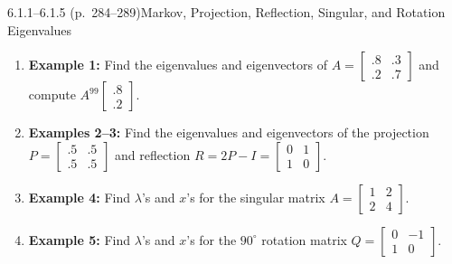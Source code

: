 \documentclass[11pt,a4paper,openany,oneside]{book}
\def\vect#1{#1}%
\def\mathbf#1{#1}%
\newcommand{\vect}[1]{\mathbf{#1}}
\numberwithin{equation}{chapter}
\begin{document}
\begin{example}{6.1.1--6.1.5 (p.\ 284--289)}{Markov, Projection, Reflection, Singular, and Rotation Eigenvalues}
\begin{enumerate}
\item \textbf{Example 1:} Find the eigenvalues and eigenvectors of $A = \begin{bmatrix}.8 & .3\\.2 & .7\end{bmatrix}$ and compute $A^{99}\begin{bmatrix}.8\\.2\end{bmatrix}$.
\item \textbf{Examples 2--3:} Find the eigenvalues and eigenvectors of the projection $P = \begin{bmatrix}.5 & .5\\.5 & .5\end{bmatrix}$ and reflection $R = 2P - I = \begin{bmatrix}0 & 1\\1 & 0\end{bmatrix}$.
\item \textbf{Example 4:} Find $\lambda$'s and $\vect{x}$'s for the singular matrix $A = \begin{bmatrix}1 & 2\\2 & 4\end{bmatrix}$.
\item \textbf{Example 5:} Find $\lambda$'s and $\vect{x}$'s for the $90^\circ$ rotation matrix $Q = \begin{bmatrix}0 & -1\\1 & 0\end{bmatrix}$.
\end{enumerate}
\end{example}
\end{document}
